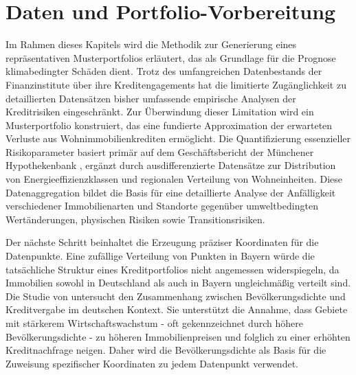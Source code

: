\section{Daten und Portfolio-Vorbereitung}

Im Rahmen dieses Kapitels wird die Methodik zur Generierung eines repräsentativen Musterportfolios erläutert, das als Grundlage für die Prognose klimabedingter Schäden dient. Trotz des umfangreichen Datenbestands der Finanzinstitute über ihre Kreditengagements hat die limitierte Zugänglichkeit zu detaillierten Datensätzen bisher umfassende empirische Analysen der Kreditrisiken eingeschränkt. Zur Überwindung dieser Limitation wird ein Musterportfolio konstruiert, das eine fundierte Approximation der erwarteten Verluste aus Wohnimmobilienkrediten ermöglicht. Die Quantifizierung essenzieller Risikoparameter basiert primär auf dem Geschäftsbericht der Münchener Hypothekenbank \parencite{MuenchenerHyp2022}, ergänzt durch ausdifferenzierte Datensätze zur Distribution von Energieeffizienzklassen und regionalen Verteilung von Wohneinheiten. Diese Datenaggregation bildet die Basis für eine detaillierte Analyse der Anfälligkeit verschiedener Immobilienarten und Standorte gegenüber umweltbedingten Wertänderungen, physischen Risiken sowie Transitionsrisiken.

Der nächste Schritt beinhaltet die Erzeugung präziser Koordinaten für die Datenpunkte. Eine zufällige Verteilung von Punkten in Bayern würde die tatsächliche Struktur eines Kreditportfolios nicht angemessen widerspiegeln, da Immobilien sowohl in Deutschland als auch in Bayern ungleichmäßig verteilt sind. Die Studie von \textcite{zurek2022real} untersucht den Zusammenhang zwischen Bevölkerungsdichte und Kreditvergabe im deutschen Kontext. Sie unterstützt die Annahme, dass Gebiete mit stärkerem Wirtschaftswachstum - oft gekennzeichnet durch höhere Bevölkerungsdichte - zu höheren Immobilienpreisen und folglich zu einer erhöhten Kreditnachfrage neigen. Daher wird die Bevölkerungsdichte als Basis für die Zuweisung spezifischer Koordinaten zu jedem Datenpunkt verwendet.

